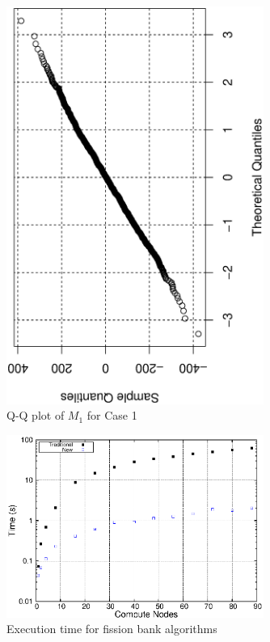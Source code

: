 \documentclass[11pt]{article}
\begin{document}
\clearpage
\begin{figure}[p]
  \centering
  \includegraphics[width=0.75\textwidth,angle=-90]{QQplot.eps}
  \caption{Q-Q plot of $M_1$ for Case 1}
  \label{fig:QQ-plot}
\end{figure}

\clearpage
\begin{figure}[p]
  \centering
  \includegraphics[width=0.75\textwidth]{time.eps}
  \caption{Execution time for fission bank algorithms}
  \label{fig:algorithm-time}
\end{figure}
\end{document}
